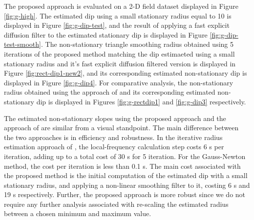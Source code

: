 The proposed approach is evaluated on a 2-D field dataset displayed in Figure \ref{fig:g-high}. The estimated dip using a small stationary radius equal to 10 is displayed in Figure \ref{fig:g-dip-test}, and the result of applying a fast explicit diffusion filter to the estimated stationary dip is displayed in Figure \ref{fig:g-dip-test-smooth}. The non-stationary triangle smoothing radius obtained using 5 iterations of the proposed method matching the dip estimaeted using a small stationary radius and it's fast explicit diffusion filtered version is displayed in Figure \ref{fig:rect-dip1-new2}, and its corresponding estimated non-stationary dip is displayed in Figure \ref{fig:g-dip4}. For comparative analysis, the non-stationary radius obtained using the approach of \cite{wang2021} and its corresponding estimated non-stationary dip is displayed in Figures \ref{fig:g-rectdip1} and \ref{fig:g-dip3} respectively. 



The estimated non-stationary slopes using the proposed approach and the approach of \cite{wang2021} are similar from a visual standpoint. The main difference between the two approaches is in efficiency and robustness. In the iterative radius estimation approach of \cite{wang2021}, the local-frequency calculation step costs 6 s per iteration, adding up to a total cost of 30 s for 5 iteration. For the Gauss-Newton method, the cost per iteration is less than 0.1 s. The main cost associated with the proposed method is the initial computation of the estimated dip with a small stationary radius, and applying a non-linear smoothing filter to it, costing 6 s and 19 s respectively. 
Further, the proposed approach is more robust since we do not require any further analysis associated with re-scaling the estimated radius between a chosen minimum and maximum value. 


